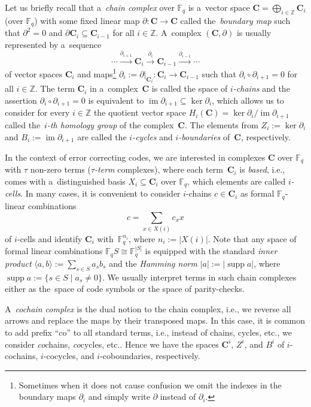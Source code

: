 \documentclass[11pt]{article}
\newcommand{\tmem}[1]{{\em #1\/}}
\theoremstyle{plain}
\theoremstyle{definition}
\theoremstyle{remark}
\newcommand{\ZZ}{\mathbb{Z}}
\newcommand{\abs}[1]{\left\lvert #1 \right\rvert}
\newcommand{\sC}{{\mathbf{C}}}
\newcommand{\Z}{\mathbb{Z}}
\newcommand{\F}{\mathbb{F}}
\DeclareMathOperator{\im}{im}
\DeclareMathOperator{\supp}{supp}
\begin{document}
Let us briefly recall that a~\emph{chain complex} over $\F_q$ is a~vector space $\sC = \bigoplus_{i\in\ZZ}\sC_i$ (over $\F_q$) with some fixed linear map $\partial\colon\sC
\rightarrow \sC $ called the~{\tmem{boundary map}} such that $\partial^2 = 0$ and $\partial
\sC_{i} \subseteq \sC_{i-1}$ for all $i\in \mathbb{Z}$. A~complex $(\sC,\partial)$ is usually represented by a~sequence 
\[\cdots\xrightarrow{\partial_{i+1}} \sC_{i} \xrightarrow{\partial_{i}} \sC_{i-1} \xrightarrow{\partial_{i-1}}\cdots\]
of vector spaces $\sC_i$ and maps\footnote{Sometimes when it does not cause confusion we omit the indexes in the boundary maps $\partial_i$ and simply write $\partial$ instead of $\partial_i$.} $\partial_i := \partial
|_{\sC_i}\colon\sC_i \rightarrow \sC_{i - 1}$ such that $\partial_{i}\circ \partial_{i+1} = 0$ for all $i\in\Z$. The term $\sC_i$ in a~complex~$\sC$ is called the space of \emph{$i$-chains} and the assertion $\partial_{i}\circ \partial_{i+1} = 0$ is equivalent to $\im \partial_{i+1} \subseteq \ker \partial_i$, which allows us to consider for every $i\in\Z$ the quotient vector space $H_i(\sC) = \ker \partial_i / \im \partial_{i+1}$ called the~\emph{$i$-th homology group} of the complex~$\sC$. 
The elements from $Z_i  := \ker \partial_i$ and $B_i  := \im \partial_{i+1}$ are called
the {\tmem{$i$-cycles}} and {\tmem{$i$-boundaries}} of~$\sC$, respectively. 

In the context of error correcting codes, we are interested in complexes $\sC$ over $\F_q$ with $\tau$ non-zero terms (\emph{$\tau$-term} complexes), where each term~$\sC_i$ is \emph{based}, i.e.,  comes with a~distinguished basis ${X_i \subseteq \sC_i}$ over $\F_q$, which elements are called \emph{$i$-cells}. In many cases, it is convenient to consider $i$-chains $c\in \sC_i$ as formal $\F_q$-linear combinations 
\[c = \sum_{x\in X(i)} c_x x\] 
of $i$-cells and identify $\sC_i$ with~$\F_q^{n_i}$, where $n_i := \abs{X(i)}$. Note that any space of formal linear combinations $\F_q S \cong \F_q^{|S|}$ is equipped with the standard \emph{inner product} $\langle a, b \rangle := \sum_{s\in S} a_s b_s$ and the \emph{Hamming norm} $\abs{a} := \abs{\supp a}$, where $\supp a := \{s \in S \mid a_s \ne 0\}$. We usually interpret terms in such chain complexes either as the~space of code symbols or the space of parity-checks. 

A~\emph{cochain complex} is the dual notion to the chain complex, i.e., we reverse all arrows and replace the maps by their transposed maps. In this case, it is common to add prefix ``co'' to all standard terms, i.e., instead of chains, cycles, etc., we consider \emph{co}chains, \emph{co}cycles, etc.. Hence we have the spaces $\sC^i$, $Z^i$, and $B^i$ of $i$-cochains, $i$-cocycles, and
$i$-coboundaries, respectively.
\end{document}
